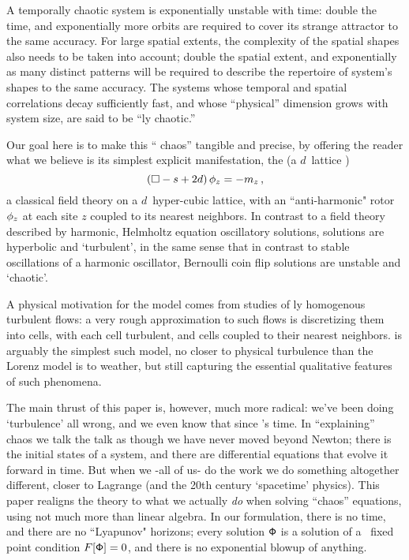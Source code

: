 

\bigskip

\noindent
A temporally chaotic system is exponentially unstable with time: double the
time, and exponentially more orbits are required to cover its strange
attractor to the same accuracy. For large spatial extents, the complexity of
the spatial shapes also needs to be taken into account; double the spatial
extent, and exponentially as many distinct
{\spt} patterns will be required to describe the repertoire of
system's shapes to the same accuracy.
The systems whose temporal and spatial correlations decay sufficiently fast,
and whose ``physical'' dimension grows with
system size, are said to be ``{\spt}ly chaotic.''

Our goal here is to make this ``{\spt} chaos'' tangible and precise, by
offering the reader what we believe is its simplest explicit
manifestation, the {\em \catlatt} (a $d$\dmn\ lattice {\sPe})
\[
 (\Box -s+2d)\,\phi_{z}  =  -{m_{z}}
 \,,
\]
a classical field theory on a $d$\dmn\ hyper-cubic lattice, with an
``anti-harmonic" rotor $\phi_{z}$ at each site $z$ coupled to its nearest
neighbors.
In contrast to a field theory described by harmonic, Helmholtz equation
oscillatory solutions, {\catlatt} solutions are hyperbolic and
`turbulent', in the same sense that in contrast to stable oscillations of
a harmonic oscillator, Bernoulli coin flip solutions are unstable and
`chaotic'.

A physical motivation for the model comes from studies of {\spt}ly
homogenous turbulent flows: a very rough approximation to such flows is
discretizing them into {\spt} cells, with each cell turbulent, and cells
coupled to their nearest neighbors.  {\catLatt} is arguably the simplest
such model, no closer to physical turbulence than the Lorenz
model is to weather, but still capturing the essential
qualitative features of such phenomena.

The main thrust of this paper is, however, much more radical: we've been
doing `turbulence' all wrong, and we even know that since \Poincare's
time. In ``explaining'' chaos we talk the talk as though we have never
moved beyond Newton; there is the initial states of a system, and there
are differential equations that evolve it forward in time. But when we
-all of us- do the work we do something altogether different, closer to
Lagrange (and the 20th century `spacetime' physics). This paper realigns
the theory to what we actually {\em do} when solving ``chaos'' equations,
using not much more than linear algebra. In our formulation, there is no
time, and there are no ``Lyapunov" horizons; every solution $\mathsf{\Phi}$ is a
solution of a \spt\ fixed point condition $F[\mathsf{\Phi}]=0$, and there is no
exponential blowup of anything.

